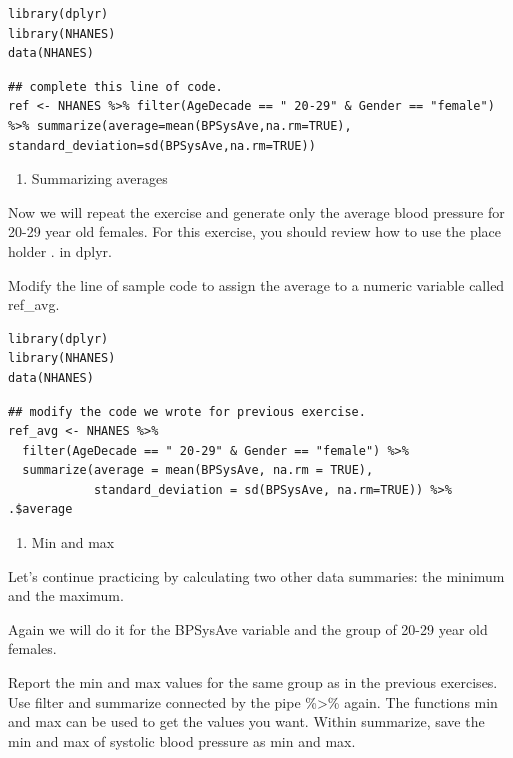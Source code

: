 \documentclass[
]{article}
\providecommand{\tightlist}{%
  \setlength{\itemsep}{0pt}\setlength{\parskip}{0pt}}
\begin{document}
\begin{verbatim}
library(dplyr)
library(NHANES)
data(NHANES)
\end{verbatim}

\begin{verbatim}
## complete this line of code.
ref <- NHANES %>% filter(AgeDecade == " 20-29" & Gender == "female") %>% summarize(average=mean(BPSysAve,na.rm=TRUE), standard_deviation=sd(BPSysAve,na.rm=TRUE))
\end{verbatim}

\begin{enumerate}
\def\labelenumi{\arabic{enumi}.}
\setcounter{enumi}{2}
\tightlist
\item
  Summarizing averages
\end{enumerate}

Now we will repeat the exercise and generate only the average blood
pressure for 20-29 year old females. For this exercise, you should
review how to use the place holder . in dplyr.

Modify the line of sample code to assign the average to a numeric
variable called ref\_avg.

\begin{verbatim}
library(dplyr)
library(NHANES)
data(NHANES)
\end{verbatim}

\begin{verbatim}
## modify the code we wrote for previous exercise.
ref_avg <- NHANES %>%
  filter(AgeDecade == " 20-29" & Gender == "female") %>%
  summarize(average = mean(BPSysAve, na.rm = TRUE), 
            standard_deviation = sd(BPSysAve, na.rm=TRUE)) %>% .$average
\end{verbatim}

\begin{enumerate}
\def\labelenumi{\arabic{enumi}.}
\setcounter{enumi}{3}
\tightlist
\item
  Min and max
\end{enumerate}

Let's continue practicing by calculating two other data summaries: the
minimum and the maximum.

Again we will do it for the BPSysAve variable and the group of 20-29
year old females.

Report the min and max values for the same group as in the previous
exercises. Use filter and summarize connected by the pipe
\%\textgreater\% again. The functions min and max can be used to get the
values you want. Within summarize, save the min and max of systolic
blood pressure as min and max.
\end{document}
